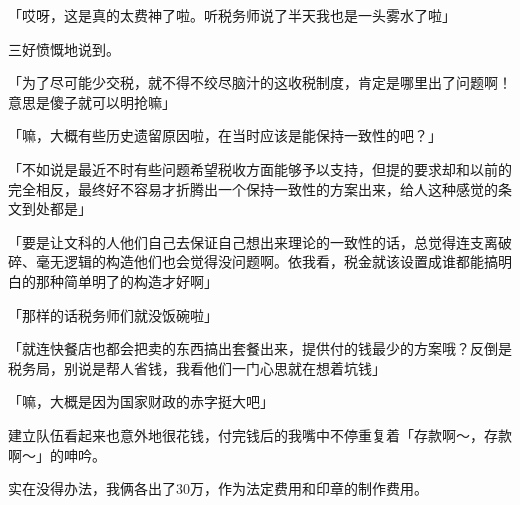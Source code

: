 「哎呀，这是真的太费神了啦。听税务师说了半天我也是一头雾水了啦」

三好愤慨地说到。

「为了尽可能少交税，就不得不绞尽脑汁的这收税制度，肯定是哪里出了问题啊！意思是傻子就可以明抢嘛」

「嘛，大概有些历史遗留原因啦，在当时应该是能保持一致性的吧？」

「不如说是最近不时有些问题希望税收方面能够予以支持，但提的要求却和以前的完全相反，最终好不容易才折腾出一个保持一致性的方案出来，给人这种感觉的条文到处都是」

「要是让文科的人他们自己去保证自己想出来理论的一致性的话，总觉得连支离破碎、毫无逻辑的构造他们也会觉得没问题啊。依我看，税金就该设置成谁都能搞明白的那种简单明了的构造才好啊」

「那样的话税务师们就没饭碗啦」

「就连快餐店也都会把卖的东西搞出套餐出来，提供付的钱最少的方案哦？反倒是税务局，别说是帮人省钱，我看他们一门心思就在想着坑钱」

「嘛，大概是因为国家财政的赤字挺大吧」

建立队伍看起来也意外地很花钱，付完钱后的我嘴中不停重复着「存款啊～，存款啊～」的呻吟。

实在没得办法，我俩各出了30万，作为法定费用和印章的制作费用。

